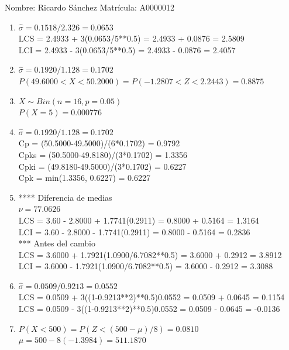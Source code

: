 \documentclass[8pt]{report}
\begin{document}
 \newpage

Nombre: \underline{\hspace*{.2in}}
Ricardo Sánchez
\underline{\hspace*{.2in}} \quad Matr\'icula:\underline{\hspace*{.2in}}
A0000012
\underline{\hspace*{.2in}} \\

\begin{enumerate}
\item $\hat\sigma = 0.1518/2.326 = 0.0653$\\
LCS = 2.4933 + 3(0.0653/5**0.5) = 2.4933 + 0.0876 = 2.5809\\
LCI = 2.4933 - 3(0.0653/5**0.5) = 2.4933 - 0.0876 = 2.4057
\item $\hat\sigma = 0.1920/1.128 = 0.1702$\\
$P(49.6000 < X < 50.2000) = P(-1.2807 < Z < 2.2443) = 0.8875$\\
\item $X \sim Bin(n=16, p=0.05)$\\
$P(X = 5) = 0.000776$
\item $\hat\sigma = 0.1920/1.128 = 0.1702$\\
Cp = (50.5000-49.5000)/(6*0.1702) = 0.9792\\
Cpks = (50.5000-49.8180)/(3*0.1702) = 1.3356\\
Cpki = (49.8180-49.5000)/(3*0.1702) = 0.6227\\
Cpk = min(1.3356, 0.6227) = 0.6227
\item **** Diferencia de medias\\
$\nu = 77.0626$\\
LCS = 3.60 - 2.8000 + 1.7741(0.2911) = 0.8000 + 0.5164 = 1.3164\\
LCI = 3.60 - 2.8000 - 1.7741(0.2911) = 0.8000 - 0.5164 = 0.2836\\
*** Antes del cambio\\
LCS = 3.6000 + 1.7921(1.0900/6.7082**0.5) = 3.6000 + 0.2912 = 3.8912\\
LCI = 3.6000 - 1.7921(1.0900/6.7082**0.5) = 3.6000 - 0.2912 = 3.3088\\
\item $\hat\sigma = 0.0509/0.9213 = 0.0552$\\
LCS = 0.0509 + 3((1-0.9213**2)**0.5)0.0552 = 0.0509 + 0.0645 = 0.1154\\
LCS = 0.0509 - 3((1-0.9213**2)**0.5)0.0552 = 0.0509 - 0.0645 = -0.0136
\item $P(X < 500) = P(Z < (500-\mu)/8) = 0.0810$\\
$\mu = 500 - 8(-1.3984) = 511.1870$\\
\end{enumerate}
\end{document}
